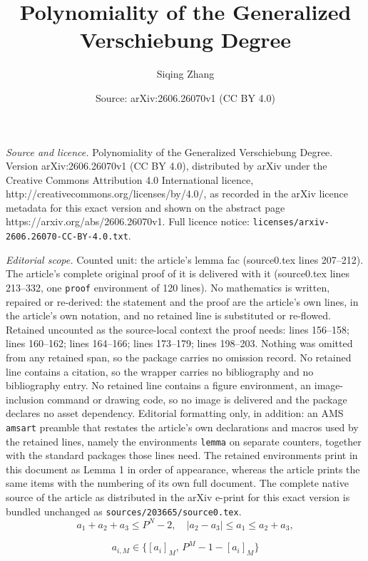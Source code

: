 \documentclass[10pt,a4paper]{amsart}
\title{Polynomiality of the Generalized Verschiebung Degree}
\author{Siqing Zhang}
\date{Source: arXiv:2606.26070v1 (CC BY 4.0)}
\begin{document}
\maketitle

\noindent\emph{Source and licence.} Polynomiality of the Generalized Verschiebung Degree. Version arXiv:2606.26070v1 (CC BY 4.0), distributed by arXiv under the Creative Commons Attribution 4.0 International licence, http://creativecommons.org/licenses/by/4.0/, as recorded in the arXiv licence metadata for this exact version and shown on the abstract page https://arxiv.org/abs/2606.26070v1. Full licence notice: \texttt{licenses/arxiv-2606.26070-CC-BY-4.0.txt}.\par\smallskip

\noindent\textit{Editorial scope.} Counted unit: the article's lemma fac (source0.tex lines 207--212). The article's complete original proof of it is delivered with it (source0.tex lines 213--332, one \texttt{proof} environment of 120 lines). No mathematics is written, repaired or re-derived: the statement and the proof are the article's own lines, in the article's own notation, and no retained line is substituted or re-flowed.  Retained uncounted as the source-local context the proof needs: lines 156--158; lines 160--162; lines 164--166; lines 173--179; lines 198--203.  Nothing was omitted from any retained span, so the package carries no omission record.  No retained line contains a citation, so the wrapper carries no bibliography and no bibliography entry.  No retained line contains a figure environment, an image-inclusion command or drawing code, so no image is delivered and the package declares no asset dependency.  Editorial formatting only, in addition: an AMS \texttt{amsart} preamble that restates the article's own declarations and macros used by the retained lines, namely the environments \texttt{lemma} on separate counters, together with the standard packages those lines need.  The retained environments print in this document as Lemma 1 in order of appearance, whereas the article prints the same items with the numbering of its own full document.  The complete native source of the article as distributed in the arXiv e-print for this exact version is bundled unchanged as \texttt{sources/203665/source0.tex}.
\begin{equation}\label{eq: upper}
    a_1+a_2+a_3\leq P^N-2,\quad |a_2-a_3|\leq a_1\leq a_2+a_3,
\end{equation}

\begin{equation}\label{eq: am}
    a_{i,M}\in \{[a_i]_M,\, P^M-1-[a_i]_M\}
\end{equation}
\end{document}
